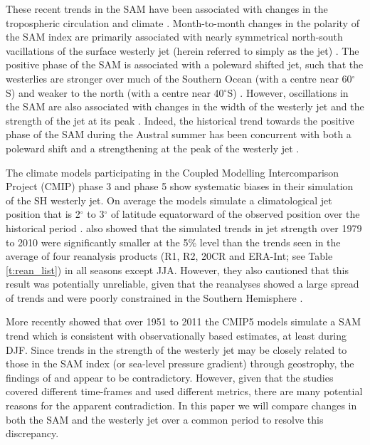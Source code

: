\documentclass{ametsoc}
\begin{document}
These recent trends in the SAM have been associated with changes in the tropospheric circulation and climate 
\citep{Thompson_and_Solomon_2002, Thompson_et_al_2011}. Month-to-month changes in the polarity of the SAM index are
primarily associated with nearly symmetrical north-south vacillations of the surface westerly jet (herein referred
to simply as the jet)
\citep{Hartmann_and_Lo_1998, Thompson_and_Wallace_2000}. The positive phase of the SAM is associated
with a poleward shifted jet, such that the westerlies are stronger over much of the Southern Ocean 
(with a centre near 60$^{\circ}$S) and weaker to the north (with a centre near 40$^{\circ}$S) 
\citep{Thompson_et_al_2011}. However, oscillations in the SAM are also associated with changes 
in the width of the westerly jet and the strength of the jet at its peak \citep{Monahan_and_Fyfe_2006}. 
Indeed, the historical trend towards the positive phase of the SAM during the Austral summer has 
been concurrent with both a poleward shift and a strengthening at the peak of the westerly 
jet \citep{Swart_and_Fyfe_2012b}. 

The climate models participating in the Coupled Modelling Intercomparison Project (CMIP) phase 3 and phase 5
show systematic biases in their simulation of the SH westerly jet. On average the models simulate a
climatological jet position that is 2$^{\circ}$ to 3$^{\circ}$ of latitude equatorward of the observed 
position over the historical period \citep{Swart_and_Fyfe_2012b, Bracegirdle_et_al_2013}. 
\cite{Swart_and_Fyfe_2012b} also showed that the simulated
trends in jet strength  over 1979 to 2010 were significantly smaller at the 5\% level 
than the trends seen in the average of four reanalysis products (R1, R2, 20CR and ERA-Int; see 
Table \ref{t:rean_list}) 
in all seasons except JJA. However, they also cautioned that this result was potentially unreliable, given 
that the reanalyses showed a large spread of trends and were poorly constrained in the Southern Hemisphere 
\citep{Swart_and_Fyfe_2012b}.

More recently \cite{Gillett_and_Fyfe_2013} showed that over 1951 to 2011 the CMIP5 models simulate a SAM trend 
which is consistent with observationally based estimates, at least during DJF. Since 
trends in the strength of the westerly jet may be closely related to those in the SAM index (or sea-level 
pressure gradient) through geostrophy, the findings of \citet{Swart_and_Fyfe_2012b} and \cite{Gillett_and_Fyfe_2013}
 appear to be contradictory. However, given
that the studies covered different time-frames and used different metrics, there are many potential 
reasons for the apparent contradiction. In this paper we will compare changes in both the SAM and the 
westerly jet over a common period to resolve this discrepancy.
\end{document}
